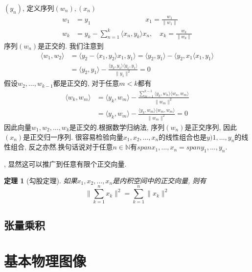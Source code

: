 \documentclass{book}
\newtheorem{theorem}{\hspace{2em}定理}[section]
\begin{document}
$(y_n)$, 定义序列$(w_n),(x_n)$
\begin{equation*}
\begin{split}
   w_1 & =y_1\quad\quad\quad\quad\quad\quad\quad\quad x_1=\frac{w_1}{\|w_1\|}\\
    w_k & =y_k-\sum_{n=1}^{k}\langle x_n,y_k\rangle x_n,\quad x_k=\frac{w_k}{\|w_k\|}
\end{split}
\end{equation*}
序列$(w_n)$是正交的. 我们注意到
\begin{equation*}
\begin{split}
   \langle w_1,w_2\rangle & =\langle y_2-\langle x_1,y_2\rangle x_1,y_1\rangle=\langle y_2,y_1\rangle-\langle y_2,x_1\langle x_1,y_1\rangle \\
     & =\langle y_2,y_1\rangle-\frac{\langle y_2,y_1\rangle\langle y_1,y_1\rangle}{\|y_1\|^2}=0
\end{split}
\end{equation*}
假设$w_2,\dots,w_{k-1}$都是正交的, 对于任意$m<k$都有
\begin{equation*}
\begin{split}
   \langle w_k,w_m\rangle & =\langle y_k,w_m\rangle-\frac{\sum_{m-1}^{k-1}\langle y_k,w_n\rangle\langle w_n,w_m\rangle}{\|w_m\|^2} \\
     & =\langle y_k,w_m\rangle-\frac{\langle y_k,w_m\rangle\langle w_m,w_m\rangle}{\|w_m\|^2}=0
\end{split}
\end{equation*}
因此向量$w_1,w_2,\dots,w_k$是正交的.根据数学归纳法, 序列$(w_n)$是正交序列, 因此$(x_n)$是正交归一序列. 很容易检验向量$x_1,x_2,\dots,x_n$的线性组合也是$y)1,\dots,y_n$的线性组合, 反之亦然.换句话说对于任意$n\in \mathbb{N}$有$span{x_1,\dots,x_n}=span{y_1,\dots,y_n}$.

, 显然这可以推广到任意有限个正交向量.
\begin{theorem}[勾股定理]
  如果$x_1,x_2,\dots,x_n$是内积空间中的正交向量, 则有
  \begin{equation*}
    \|\sum_{k=1}^{n}x_k\|^2=\sum_{k=1}^{n}\|x_k\|^2
  \end{equation*}
\end{theorem}
\section{张量乘积}
\chapter{基本物理图像}
\end{document}
